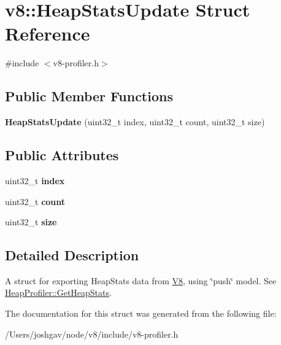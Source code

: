 \hypertarget{structv8_1_1_heap_stats_update}{}\section{v8\+:\+:Heap\+Stats\+Update Struct Reference}
\label{structv8_1_1_heap_stats_update}


{\ttfamily \#include $<$v8-\/profiler.\+h$>$}

\subsection*{Public Member Functions}
\begin{DoxyCompactItemize}
\item 
{\bfseries Heap\+Stats\+Update} (uint32\+\_\+t index, uint32\+\_\+t count, uint32\+\_\+t size)\hypertarget{structv8_1_1_heap_stats_update_aba606181fa7071647cc91a558c450cf3}{}\label{structv8_1_1_heap_stats_update_aba606181fa7071647cc91a558c450cf3}

\end{DoxyCompactItemize}
\subsection*{Public Attributes}
\begin{DoxyCompactItemize}
\item 
uint32\+\_\+t {\bfseries index}\hypertarget{structv8_1_1_heap_stats_update_a90f427acc6e9b8cf2001ca09541545d7}{}\label{structv8_1_1_heap_stats_update_a90f427acc6e9b8cf2001ca09541545d7}

\item 
uint32\+\_\+t {\bfseries count}\hypertarget{structv8_1_1_heap_stats_update_aa74badb1bd196e538b45b971350c33de}{}\label{structv8_1_1_heap_stats_update_aa74badb1bd196e538b45b971350c33de}

\item 
uint32\+\_\+t {\bfseries size}\hypertarget{structv8_1_1_heap_stats_update_a842a199bd372f411f0ae5816e38c45e2}{}\label{structv8_1_1_heap_stats_update_a842a199bd372f411f0ae5816e38c45e2}

\end{DoxyCompactItemize}


\subsection{Detailed Description}
A struct for exporting Heap\+Stats data from \hyperlink{classv8_1_1_v8}{V8}, using \char`\"{}push\char`\"{} model. See \hyperlink{classv8_1_1_heap_profiler_a756d71126e0effc7543fb33e856dd738}{Heap\+Profiler\+::\+Get\+Heap\+Stats}. 

The documentation for this struct was generated from the following file\+:\begin{DoxyCompactItemize}
\item 
/\+Users/joshgav/node/v8/include/v8-\/profiler.\+h\end{DoxyCompactItemize}
